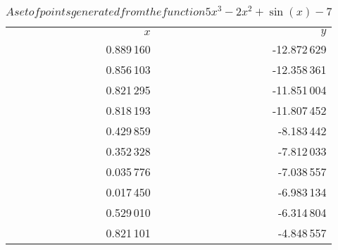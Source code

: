 \begin{table}[ht!]
  \centering
  \begin{tabular}{|r|r|}
    $x$ & $y$	\\
    0.889\,160 & -12.872\,629	\\
    0.856\,103 & -12.358\,361	\\
    0.821\,295 & -11.851\,004	\\
    0.818\,193 & -11.807\,452	\\
    0.429\,859 & -8.183\,442	\\
    0.352\,328 & -7.812\,033	\\
    0.035\,776 & -7.038\,557	\\
    0.017\,450 & -6.983\,134	\\
    0.529\,010 & -6.314\,804	\\
    0.821\,101 & -4.848\,557	\\
  \end{tabular}
  \caption{$A set of points generated from the function 5x^3 - 2x^2 + \sin(x) - 7$}
  \label{tab:bg:gp:repr_ev:points}
\end{table}